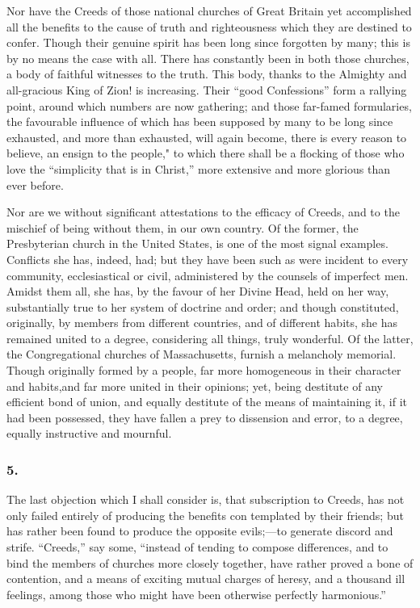 \documentclass[
]{book}
\begin{document}
Nor have the Creeds of those national churches of Great Britain yet accomplished all the benefits to the cause of truth and righteousness which they are destined to confer. Though their genuine spirit has been long since forgotten by many; this is by no means the case with all. There has constantly been in both those churches, a body of faithful witnesses to the truth. This body, thanks to the Almighty and all-gracious King of Zion! is increasing. Their ``good Confessions'' form a rallying point, around which numbers are now gathering; and those far-famed formularies, the favourable influence of which has been supposed by many to be long since exhausted, and more than exhausted, will again become, there is every reason to believe, an ensign to the people," to which there shall be a flocking of those who love the ``simplicity that is in Christ,'' more extensive and more glorious than ever before.

Nor are we without significant attestations to the efficacy of Creeds, and to the mischief of being without them, in our own country. Of the former, the Presbyterian church in the United States, is one of the most signal examples. Conflicts she has, indeed, had; but they have been such as were incident to every community, ecclesiastical or civil, administered by the counsels of imperfect men. Amidst them all, she has, by the favour of her Divine Head, held on her way, substantially true to her system of doctrine and order; and though constituted, originally, by members from different countries, and of different habits, she has remained united to a degree, considering all things, truly wonderful. Of the latter, the Congregational churches of Massachusetts, furnish a melancholy memorial. Though originally formed by a people, far more homogeneous in their character and habits,and far more united in their opinions; yet, being destitute of any efficient bond of union, and equally destitute of the means of maintaining it, if it had been possessed, they have fallen a prey to dissension and error, to a degree, equally instructive and mournful.

\hypertarget{section-11}{%
\subsubsection*{5.}\label{section-11}}

The last objection which I shall consider is, that subscription to Creeds, has not only failed entirely of producing the benefits con templated by their friends; but has rather been found to produce the opposite evils;---to generate discord and strife. ``Creeds,'' say some, ``instead of tending to compose differences, and to bind the members of churches more closely together, have rather proved a bone of contention, and a means of exciting mutual charges of heresy, and a thousand ill feelings, among those who might have been otherwise perfectly harmonious.''
\end{document}
